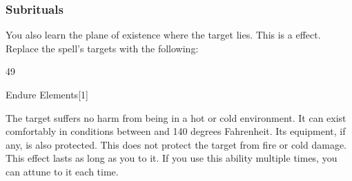 \subsubsection{Subrituals}
You also learn the plane of existence where the target lies.
This is a  effect.
Replace the spell's targets with the following:
\begin{spellcontent}
\begin{augmenttargetinginfo}
 49
\end{augmenttargetinginfo}
\end{spellcontent}
\begin{spellsection}{Endure Elements}[1]
\begin{spellcontent}
\begin{spelltargetinginfo}
\end{spelltargetinginfo}
\begin{spelleffects}
\spelleffect
The target suffers no harm from being in a hot or cold environment.
It can exist comfortably in conditions between  and 140 degrees Fahrenheit.
Its equipment, if any, is also protected.
This does not protect the target from fire or cold damage.
This effect lasts as long as you  to it.
If you use this ability multiple times, you can attune to it each time.
\end{spelleffects}
\end{spellcontent}
\begin{spellfooter}
\end{spellfooter}
\begin{spellsubcontent}
\end{spellsubcontent}
\end{spellsection}
